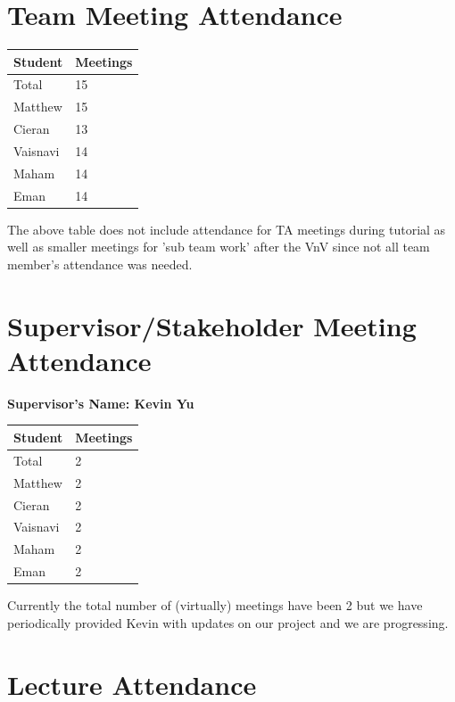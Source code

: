 \documentclass{article}
\begin{document}
\section{Team Meeting Attendance}

\begin{table}[H]
\centering
\begin{tabular}{ll}
\toprule
\textbf{Student} & \textbf{Meetings}\\
\midrule
Total & 15\\
Matthew & 15\\
Cieran & 13\\
Vaisnavi & 14\\
Maham & 14\\
Eman & 14\\
\bottomrule
\end{tabular}
\end{table}


\noindent The above table does not include attendance for TA meetings during tutorial as well as smaller meetings for 'sub team work' after the VnV since not all team member's attendance was needed.

\section{Supervisor/Stakeholder Meeting Attendance}


\noindent \textbf{Supervisor's Name: Kevin Yu} 

\begin{table}[H]
\centering
\begin{tabular}{ll}
\toprule
\textbf{Student} & \textbf{Meetings}\\
\midrule
Total & 2\\
Matthew & 2\\
Cieran & 2\\
Vaisnavi & 2\\
Maham & 2\\
Eman & 2\\
\bottomrule
\end{tabular}
\end{table}

\noindent Currently the total number of (virtually) meetings have been 2 but we have periodically provided Kevin with updates on our project and we are progressing.

\section{Lecture Attendance}
\end{document}
